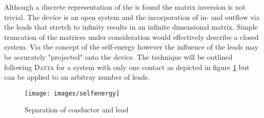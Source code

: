 Although a discrete representation of the \hamil{} is found the matrix inversion is not trivial. The device is an open system and the incorporation of in- and outflow via the leads that stretch to infinity results in an infinite dimensional matrix.
Simple truncation of the matrices under consideration would effectively describe a closed system. Via the concept of the self-energy however the influence of the leads may be accurately "projected" onto the device.
The technique will be outlined following \textsc{Datta} for a system with only one contact as depicted in figure \ref{fig:selfenergy} but can be applied to an arbitray number of leads. \begin{figure}[h!]
\centering
\texttt{[image: images/selfenergy]}
\caption{Separation of conductor and lead}
\label{fig:selfenergy}
\end{figure}

